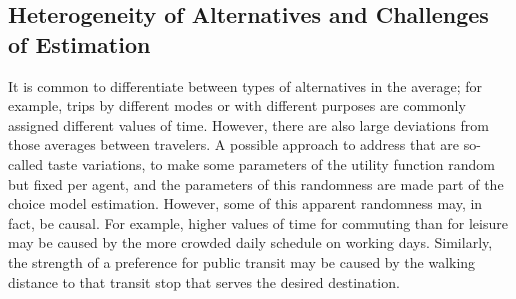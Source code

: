

\subsection{Heterogeneity of Alternatives and Challenges of Estimation}
\label{sec:estimation}

It is common to differentiate between types of alternatives in the average; for example, trips by different modes or with different purposes are commonly assigned different values of time.
%
However, there are also large deviations from those averages between travelers.
%
A possible approach to address that are so-called taste variations, \ie to make some parameters of the utility function random but fixed per agent, and the parameters of this randomness are made part of the choice model estimation.
%
However, some of this apparent randomness may, in fact, be causal.
%
For example, higher values of time for commuting than for leisure may be caused by the more crowded daily schedule on working days.  Similarly, the strength of a preference for public transit may be caused by the walking distance to that transit stop that serves the desired destination.

